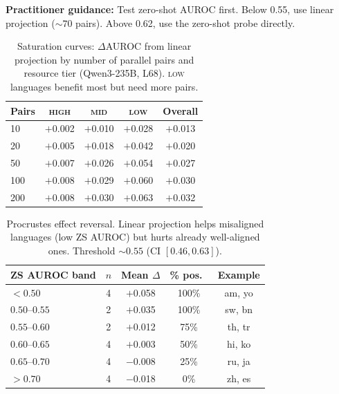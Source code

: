 \documentclass[11pt,a4paper]{article}
\newcommand{\auroc}{AUROC}
\begin{document}
\textbf{Practitioner guidance:} Test zero-shot \auroc{} first. Below 0.55, use linear projection (${\sim}70$ pairs). Above 0.62, use the zero-shot probe directly.

\begin{table}[t]
\centering
\small
\begin{tabular}{lcccc}
\toprule
Pairs & \textsc{high} & \textsc{mid} & \textsc{low} & Overall \\
\midrule
10  & $+$0.002 & $+$0.010 & $+$0.028 & $+$0.013 \\
20  & $+$0.005 & $+$0.018 & $+$0.042 & $+$0.020 \\
50  & $+$0.007 & $+$0.026 & $+$0.054 & $+$0.027 \\
100 & $+$0.008 & $+$0.029 & $+$0.060 & $+$0.030 \\
200 & $+$0.008 & $+$0.030 & $+$0.063 & $+$0.032 \\
\bottomrule
\end{tabular}
\caption{Saturation curves: $\Delta$\auroc{} from linear projection by number of parallel pairs and resource tier (Qwen3-235B, L68). \textsc{low} languages benefit most but need more pairs.}
\label{tab:saturation}
\end{table}

\begin{table}[t]
\centering
\small
\begin{tabular}{lcccc}
\toprule
ZS \auroc{} band & $n$ & Mean $\Delta$ & \% pos.\ & Example \\
\midrule
$<0.50$      & 4 & $+$0.058 & 100\% & am, yo \\
$0.50$--$0.55$ & 2 & $+$0.035 & 100\% & sw, bn \\
$0.55$--$0.60$ & 2 & $+$0.012 & 75\%  & th, tr \\
$0.60$--$0.65$ & 4 & $+$0.003 & 50\%  & hi, ko \\
$0.65$--$0.70$ & 4 & $-$0.008 & 25\%  & ru, ja \\
$>0.70$      & 4 & $-$0.018 & 0\%   & zh, es \\
\bottomrule
\end{tabular}
\caption{Procrustes effect reversal. Linear projection helps misaligned languages (low ZS \auroc{}) but hurts already well-aligned ones. Threshold ${\sim}0.55$ (CI $[0.46, 0.63]$).}
\label{tab:procrustes}
\end{table}


\end{document}
